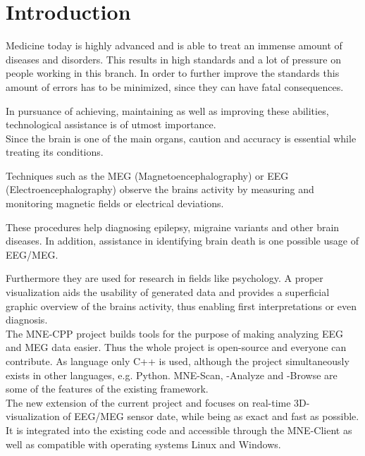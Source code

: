 
\section{Introduction}

	Medicine today is highly advanced and is able to treat an immense amount of diseases and disorders.
	This results in high standards and a lot of pressure on people working in this branch. In order to further improve the 			standards this amount of errors has to be minimized, since they can have fatal consequences.

	In pursuance of achieving, maintaining as well as improving these abilities, technological assistance is of utmost 				importance.\\  

	Since the brain is one of the main organs, caution and accuracy is essential while treating its conditions. 
	
	Techniques such as the MEG (Magnetoencephalography) or EEG (Electroencephalography) observe the brains activity by 				measuring and monitoring magnetic fields or electrical deviations.

	These procedures help diagnosing epilepsy, migraine variants and other brain diseases. In addition, assistance in 				identifying brain death is one possible usage of EEG/MEG.
	 
	Furthermore they are used for research in fields like psychology.
	A proper visualization aids the usability of generated data and provides a superficial graphic overview of the brains 			activity, thus enabling first interpretations or even diagnosis.\\
	

	The MNE-CPP  project builds tools for the purpose of making analyzing EEG and MEG data easier.
	Thus the whole project is open-source and everyone can contribute. As language only C++ is used, although the project 			simultaneously exists in other languages, e.g. Python. %
	MNE-Scan, -Analyze and -Browse are some of the features of the existing framework. \\

	The new extension of the current project and focuses on real-time 3D-visualization of EEG/MEG sensor date, while being as 		exact and fast as possible. It is integrated into the existing code and accessible through the MNE-Client as well as 			compatible with operating systems Linux and Windows.
  
